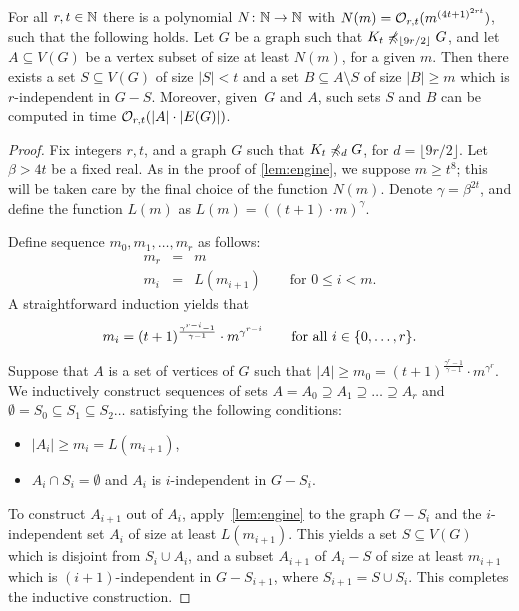 \setcounter{aux}{\thetheorem}
\setcounter{theorem}{\theuqw}
\begin{theorem}\label{thm:new-uqw}
For all $r,t\in \mathbb{N}$ there is a polynomial  $N\colon \mathbb{N}\to \mathbb{N}$ with $N(m)=
\mathcal{O}_{r,t}{(m^{{(4t+1)}^{2rt}})}$, such that the following holds.
Let $G$ be a graph such that $K_t\not\preccurlyeq_{\lfloor 9r/2\rfloor} G$, and
let $A\subseteq V(G)$ be a vertex subset of size at least $N(m)$, for a given $m$.
Then there exists a set $S\subseteq V(G)$ of size $|S|<t$ and a set $B\subseteq A\setminus S$ 
of size $|B|\geq m$ which is $r$-independent in $G-S$.
Moreover, given~$G$ and $A$, such sets $S$ and $B$ can be computed in time $\mathcal{O}_{r,t}(|A|\cdot |E(G)|)$. 
\end{theorem}
\setcounter{theorem}{\theaux}
\begin{proof}
Fix integers $r,t$,  and a graph $G$ such that $K_t\not\preccurlyeq_{d} G$,
for $d=\lfloor 9r/2 \rfloor$. Let $\beta>4t$ be a fixed real. As in the proof of \cref{lem:engine}, we suppose $m\geq t^8$; this will be taken care by the final choice of the function $N(m)$.
Denote $\gamma=\beta^{2t}$, and
define the function $L(m)$ as $L(m)=((t+1)\cdot m)^\gamma$.

Define sequence $m_0,m_1,\ldots,m_r$ as follows:
\begin{eqnarray*}
m_r & = & m\\
m_i & = & L(m_{i+1}) \qquad \textrm{for }0\leq i<m.
\end{eqnarray*}
A straightforward induction yields that 
\begin{equation*}
m_i=(t+1)^{\frac{\gamma^{r-i}-1}{\gamma-1}}\cdot m^{\gamma^{r-i}}\qquad \textrm{for all }i\in \{0,\ldots,r\}.
\end{equation*}

Suppose that $A$ is a set of vertices of $G$ such that $|A|\ge m_0=(t+1)^{\frac{\gamma^{r}-1}{\gamma-1}}\cdot m^{\gamma^{r}}$. 
We inductively construct sequences of sets $A= A_0\supseteq A_1\supseteq \ldots \supseteq A_r$ and $\emptyset=S_0\subseteq S_1\subseteq S_2\ldots$
satisfying the following conditions:
\begin{itemize}
	\item $|A_i|\ge m_i=L(m_{i+1})$,
	\item $A_i\cap S_i=\emptyset$ and $A_i$ is $i$-independent in $G-S_i$.
\end{itemize}
To construct $A_{i+1}$ out of $A_i$, apply~\cref{lem:engine} to the graph $G-S_i$ and 
the $i$-independent set $A_i$ of size at least $L(m_{i+1})$. This yields a set $S\subseteq V(G)$ which is disjoint from $S_i\cup A_i$, and a subset $A_{i+1}$ of $A_i-S$ of size 
at least $m_{i+1}$
which is $(i+1)$-independent in $G-S_{i+1}$, where $S_{i+1}=S\cup S_i$. This completes the inductive construction.


\end{proof}
